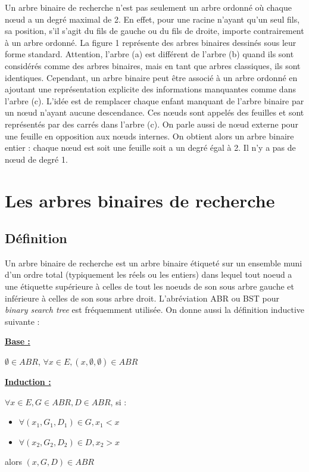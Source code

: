 \documentclass{report}
\begin{document}
Un arbre binaire de recherche n'est pas seulement un arbre ordonné où chaque nœud a un degré maximal de 2.  En effet, pour une racine n'ayant qu'un seul fils, sa position, s'il s'agit du fils de gauche ou du fils de droite, importe contrairement à un arbre ordonné.
La figure 1 représente des arbres binaires dessinés sous leur forme standard. Attention, l'arbre (a) est différent de l'arbre (b) quand ils sont considérés comme des arbres binaires, mais en tant que arbres classiques, ils sont identiques.
Cependant, un arbre binaire peut être associé à un arbre ordonné en ajoutant une représentation explicite des informations manquantes comme dans l'arbre (c). L'idée est de remplacer chaque enfant manquant de l'arbre binaire par un nœud n'ayant aucune descendance. Ces nœuds sont appelés des feuilles et sont représentés par des carrés dans l'arbre (c). On parle aussi de nœud externe pour une feuille en opposition aux nœuds internes. On obtient alors un arbre binaire entier : chaque nœud est soit une feuille soit a un degré égal à 2. Il n'y a pas de nœud de degré 1.





\section{Les arbres binaires de recherche}
\subsection{Définition}
Un arbre binaire de recherche est un arbre binaire étiqueté sur un ensemble muni d'un ordre total (typiquement les réels ou les entiers) dans lequel tout noeud a une étiquette supérieure à celles de tout les noeuds de son sous arbre gauche et inférieure à celles de son sous arbre droit. L'abréviation ABR ou BST pour \textit{binary search tree} est fréquemment utilisée. On donne aussi la définition inductive suivante :
\begin{flushleft}
    \bf
    \underline{Base :}
    
\end{flushleft}
$\emptyset \in ABR$, $\forall x \in E, (x,\emptyset, \emptyset) \in ABR$
\begin{flushleft}
    \bf
    \underline{Induction :}
\end{flushleft}
    $\forall x \in E, G \in ABR, D \in ABR$, si :
    \begin{itemize}
        \item $\forall (x_1,G_1,D_1) \in G, x_1 < x$
        \item $\forall (x_2,G_2,D_2) \in D, x_2 > x$
    \end{itemize}
    alors $(x,G,D) \in ABR$
\end{document}

